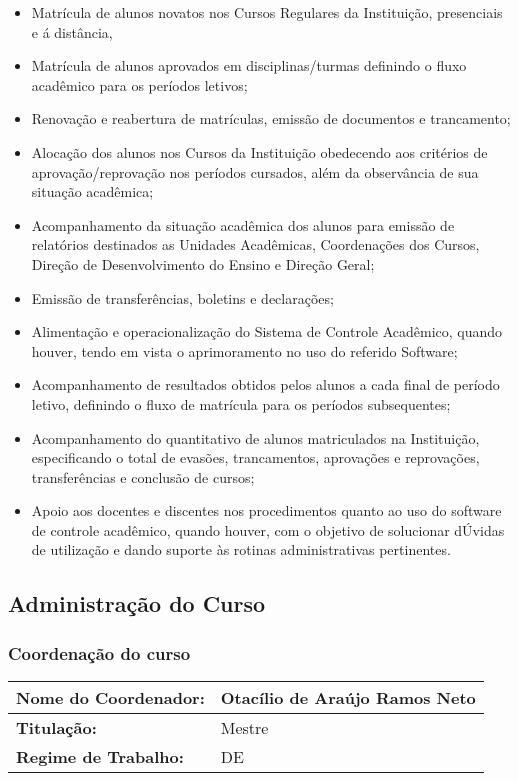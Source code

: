 \begin{itemize}
	\item Matrícula de alunos novatos nos Cursos Regulares da Instituição, presenciais e á distância, 
	\item Matrícula de alunos aprovados em disciplinas/turmas definindo o fluxo acadêmico para os períodos letivos;
	\item Renovação e reabertura de matrículas, emissão de documentos e  trancamento; 
	\item Alocação dos alunos nos Cursos da Instituição obedecendo aos critérios de aprovação/reprovação nos períodos cursados, além da observância de sua situação acadêmica;
	\item Acompanhamento da situação acadêmica dos alunos para emissão de relatórios destinados as Unidades Acadêmicas, Coordenações dos Cursos, Direção de Desenvolvimento do Ensino e Direção Geral;
	\item Emissão de transferências, boletins e declarações;

	\item Alimentação e operacionalização do Sistema de Controle Acadêmico, quando houver, tendo em vista o aprimoramento no uso do referido Software;
	\item Acompanhamento de resultados obtidos pelos alunos a cada final de período letivo, definindo o fluxo de matrícula para os períodos subsequentes; 

	\item Acompanhamento do quantitativo de alunos matriculados na Instituição, especificando o total de evasões, trancamentos, aprovações e reprovações, transferências e conclusão de cursos;
	\item Apoio aos docentes e discentes nos procedimentos quanto ao uso do software de controle acadêmico, quando houver, com o objetivo de solucionar dÚvidas de utilização e dando suporte às rotinas administrativas pertinentes.
\end{itemize}


\subsection{Administra\c{c}\~ao do Curso}

\subsubsection{Coordena\c{c}\~ao do curso}

\begin{table}[h]
\begin{tabular}{|l|l|}
\hline
\textbf{Nome do Coordenador:} & Otac\'ilio de Ara\'ujo Ramos Neto \\ \hline
\textbf{Titulação:}           & Mestre                             \\ \hline
\textbf{Regime de Trabalho:}  & DE                                 \\ \hline
\end{tabular}
\end{table}

